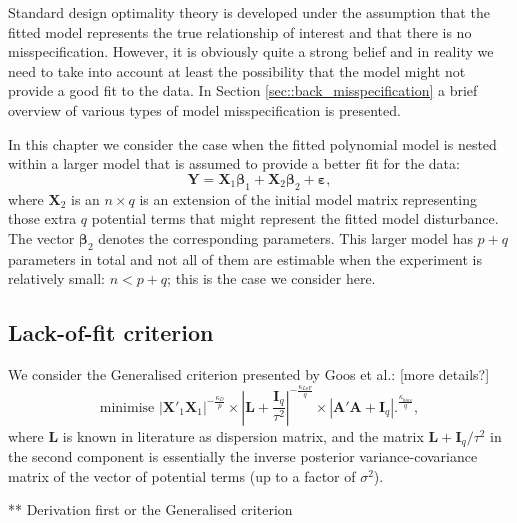 Standard design optimality theory is developed under the assumption that the fitted model represents the true relationship of interest and that there is no misspecification. However, it is obviously quite a strong belief and in reality we need to take into account at least the possibility that the model might not provide a good fit to the data. In Section \ref{sec::back_misspecification} a brief overview of various types of model misspecification is presented. 

In this chapter we consider the case when the fitted polynomial model is nested within a larger model that is assumed to provide a better fit for the data:
\begin{equation}
\label{eq::full_model}
\bm{Y}=\bm{X}_1\bm{\beta}_1+\bm{X}_2\bm{\beta}_2+\bm{\varepsilon},
\end{equation}
where $\bm{X}_2$ is an $n\times q$ is an extension of the initial model matrix representing those extra $q$ potential terms that might represent the fitted model disturbance. The vector $\bm{\beta}_2$ denotes the corresponding parameters. This larger model has $p+q$ parameters in total and not all of them are estimable when the experiment is relatively small: $n<p+q$; this is the case we consider here.
\subsection{Lack-of-fit criterion}
We consider the Generalised criterion presented by Goos et al.: [more details?]
\begin{equation*}
\mbox{minimise }|\bm{X}'_{1}\bm{X}_1|^{-\frac{\kappa_{D}}{p}}\times \left|\bm{L}+\frac{\bm{I}_{q}}{\tau^{2}}\right|^{-\frac{\kappa_{LoF}}{q}} \times |\bm{A}'\bm{A}+\bm{I}_{q}|.^{\frac{\kappa_{bias}}{q}},
\end{equation*}
where $\bm{L}$ is known in literature as dispersion matrix, and the matrix $\bm{L}+\bm{I}_{q}/\tau^{2}$ in the second component is essentially the inverse posterior variance-covariance matrix of the vector of potential terms (up to a factor of $\sigma^2$).

 ** Derivation first or the Generalised criterion

